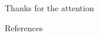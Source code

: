 \documentclass[aspectratio=169]{beamer}
\begin{document}
\begin{frame}
    \centering
    \vfill
    { Thanks for the attention}
    \vfill
\end{frame}

\appendix
\begin{frame}{References}
    \printbibliography
\end{frame}
\end{document}
